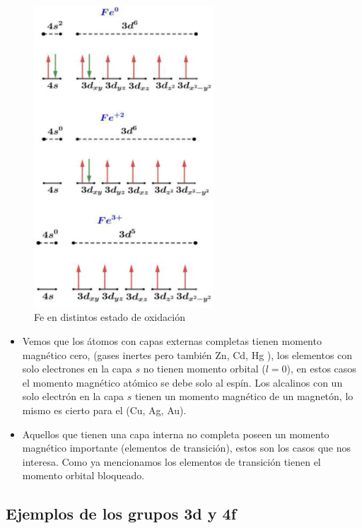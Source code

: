 \begin{figure}[H]
    \centering
    \includegraphics[width=0.6\textwidth]{./Figures/momMagElemTransicion4}
	\caption{Fe en distintos estado de oxidación}
	\label{fig:momMagElemTransicion4}
\end{figure}


\begin{itemize}
	\item Vemos que los átomos con capas externas completas tienen momento magnético cero, (gases inertes pero también Zn, Cd, Hg ), los elementos con solo electrones en la capa $s$ no tienen momento orbital ($l=0$), en estos casos el momento magnético atómico se debe solo al espín. Los alcalinos con un solo electrón en la capa $s$ tienen un momento magnético de un magnetón, lo mismo es cierto para el (Cu, Ag, Au).
	\item Aquellos que tienen una capa interna no completa poseen un momento magnético importante (elementos de transición), estos son los casos que nos interesa. Como ya mencionamos los elementos de transición tienen el momento orbital bloqueado.
\end{itemize}

\subsection{Ejemplos de los grupos 3d y 4f}

